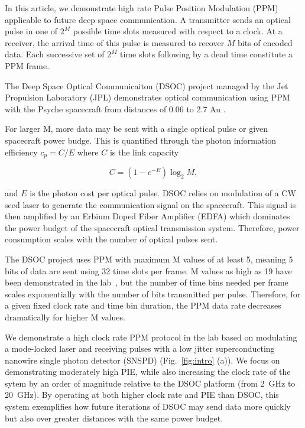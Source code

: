 \documentclass[11pt]{caltech_thesis} %
\begin{document}
In this article, we demonstrate high rate Pulse Position Modulation (PPM) applicable to future deep space communication. A transmitter sends an optical pulse in one of $2^M$ possible time slots measured with respect to a clock. At a receiver, the arrival time of this pulse is measured to recover $M$ bits of encoded data. Each successive set of $2^M$ time slots following by a dead time constitute a PPM frame.

The Deep Space Optical Communicaiton (DSOC) project managed by the Jet Propulsion Laboratory (JPL) demonstrates optical communication using PPM with the Psyche spacecraft from distances of 0.06 to 2.7 Au \autocite{Srinivasan2023GroundReceiver}.

For larger M, more data may be sent with a single optical pulse or given spacecraft power budge. This is quantified through the photon information efficiency $c_p = C/E$ where $C$ is the link capacity

$$
C=\left(1-e^{-E}\right) \log _2 M,
$$

and $E$ is the photon cost per optical pulse. DSOC relies on modulation of a CW seed laser to generate the communication signal on the spacecraft. This signal is then amplified by an Erbium Doped Fiber Amplifier (EDFA) which dominates the power budget of the spacecraft optical transmission system. Therefore, power consumption scales with the number of optical pulses sent.

The DSOC project uses PPM with maximum M values of at least 5, meaning 5 bits of data are sent using 32 time slots per frame. M values as high as 19 have been demonstrated in the lab~\autocite{essiambre2023record}, but the number of time bins needed per frame scales exponentially with the number of bits transmitted per pulse. Therefore, for a given fixed clock rate and time bin duration, the PPM data rate decreases dramatically for higher M values.

We demonstrate a high clock rate PPM protocol in the lab based on modulating a mode-locked laser and receiving pulses with a low jitter superconducting nanowire single photon detector (SNSPD) (Fig.~\ref{fig:intro} (a)). We focus on demonstrating moderately high PIE, while also increasing the clock rate of the sytem by an order of magnitude relative to the DSOC platform (from 2~GHz to 20~GHz). By operating at both higher clock rate and PIE than DSOC, this system exemplifies how future iterations of DSOC may send data more quickly but also over greater distances with the same power budget.
\end{document}
